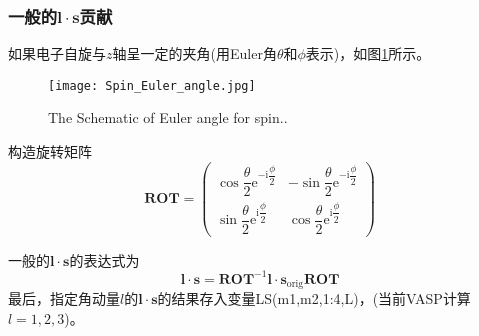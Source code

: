 \documentclass[10pt, oneside, a4paper]{article}      %
\begin{document}
\subsubsection{一般的$\mathbf{l}\cdot\mathbf{s}$贡献}
如果电子自旋与$z$轴呈一定的夹角(用\textrm{Euler}角$\theta$和$\phi$表示)，如图\ref{Fig:Euler_Angle}所示。
\begin{figure}[h!]
\centering
\vspace{-0.3in}
\texttt{[image: Spin\_Euler\_angle.jpg]}
\caption{\small\textrm{The Schematic of Euler angle for spin.}.}%
\label{Fig:Euler_Angle}
\end{figure}

构造旋转矩阵
\begin{displaymath}
	\mathbf{ROT}=
	\begin{pmatrix}
		\cos\dfrac{\theta}2\mathrm{e}^{-\mathrm{i}\dfrac{\phi}2} &-\sin\dfrac{\theta}2\mathrm{e}^{-\mathrm{i}\dfrac{\phi}2}\\
		\sin\dfrac{\theta}2\mathrm{e}^{\mathrm{i}\dfrac{\phi}2} &\cos\dfrac{\theta}2\mathrm{e}^{\mathrm{i}\dfrac{\phi}2}
	\end{pmatrix}
\end{displaymath}

一般的$\mathbf{l}\cdot\mathbf{s}$的表达式为
\begin{displaymath}
	\mathbf{l}\cdot\mathbf{s}= \mathbf{ROT}^{-1}\mathbf{l}\cdot\mathbf{s}_{\mathrm{orig}}\mathbf{ROT}
\end{displaymath}
最后，指定角动量$l$的$\mathbf{l}\cdot\mathbf{s}$的结果存入变量\textrm{LS(m1,m2,1:4,L)}，(当前\textrm{VASP}计算$l=1,2,3$)。
\end{document}
